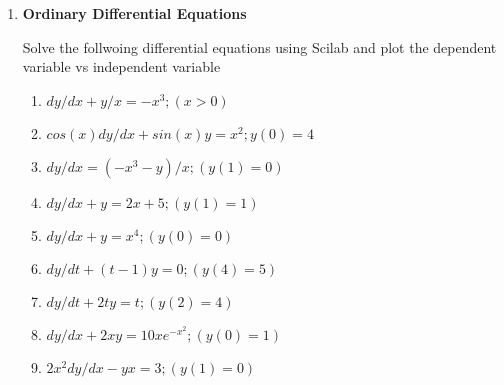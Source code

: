 \documentclass[12pt,a4paper]{article}
\newenvironment{enumcpt}{\begin{enumerate} \topsep -3mm \partopsep -3mm 
                        \parsep -3mm
                        \itemsep -0mm \leftmargin -1in \rightmargin -3mm
                        }{\end{enumerate}}
\begin{document}
\begin{multicols}{2}
\begin{enumcpt}
\begin{enumcpt}
\item Construct a polynomial with 3 repeated roots at 4 and 2 repeated
roots at 0.
Check the roots of the derivative of this polynomial. (Use derivat)

\item  Write a function that takes a polynomial and
  gives out only real roots as output.\\
  (hint isreal )

\item  Write a function that takes a polynomial and gives the
    INVERSE polynomial, i.e. all roots are inverses of each other.\\
    (Hint: Coefficients are to just be reversed.)\\
    (Check that no root was at zero: check this within the function, and
    display error, and exit.)

\item  Write a function that takes a polynomial and gives
    all the maxima/minima candidates.\\ (Hint: find all real roots of
    the derivative).

\end{enumcpt}


\item {\bf Ordinary Differential Equations}

Solve the follwoing differential equations using Scilab and plot the dependent variable vs independent variable
\begin{enumcpt}
\item  $ dy/dx + y/x = -x^3; (x>0)$
\item  $ cos(x)dy/dx + sin(x)y = x^2; y(0) = 4$
\item  $dy/dx = (-x^3-y)/x; (y(1)=0)$
\item  $dy/dx+y = 2x+5; (y(1)= 1)$
\item  $dy/dx+y = x^4; (y(0)=0)$
\item  $dy/dt + (t-1)y = 0; (y(4)=5)$
\item  $dy/dt +2ty = t; (y(2)=4)$
\item  $dy/dx+2xy=10xe^{-x^2}; (y(0)=1)$
\item  $2x^2dy/dx-yx = 3; (y(1)=0)$
\end{enumcpt}



        




\end{enumcpt}

\end{multicols}
\end{document}
